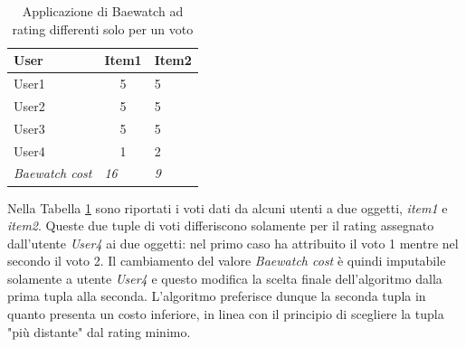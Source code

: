 \documentclass[letterpaper]{article}
\begin{document}
\begin{table}[]
\centering
\begin{tabular}{|l|c|l|}
\hline
\textbf{User}          & \multicolumn{1}{l|}{\textbf{Item1}} & \textbf{Item2} \\ \hline
User1                  & 5                                   & 5              \\ \hline
User2                  & 5                                   & 5              \\ \hline
User3                  & 5                                   & 5              \\ \hline
User4                  & 1                                   & 2              \\ \hline
\textit{Baewatch cost} & \multicolumn{1}{l|}{\textit{16}}    & \textit{9}     \\ \hline
\end{tabular}
\caption{Applicazione di Baewatch ad rating differenti solo per un voto}
\label{table:2}
\end{table}
Nella Tabella \ref{table:2} sono riportati i voti dati da alcuni utenti a due oggetti, \emph{item1} e \emph{item2}. Queste due tuple di voti differiscono solamente per il rating assegnato dall'utente \emph{User4} ai due oggetti: nel primo caso ha attribuito il voto 1 mentre nel secondo il voto 2. Il cambiamento del valore \emph{Baewatch cost} è quindi imputabile solamente a utente \emph{User4} e questo modifica la scelta finale dell'algoritmo dalla prima tupla alla seconda. L'algoritmo preferisce dunque la seconda tupla in quanto presenta un costo inferiore, in linea con il principio di scegliere la tupla "più distante" dal rating minimo.


\end{document}
